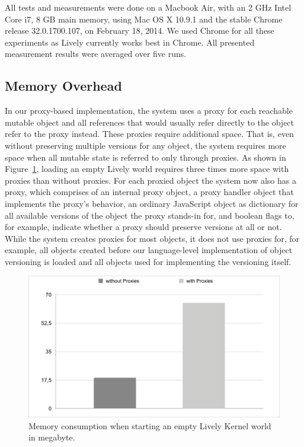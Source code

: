 All tests and measurements were done on a Macbook Air, with an 2 GHz Intel Core i7, 8 GB main memory, using Mac OS X 10.9.1 and the stable Chrome release 32.0.1700.107, on February 18, 2014.
We used Chrome for all these experiments as Lively currently works best in Chrome.
All presented measurement results were averaged over five runs.


\subsection{Memory Overhead}


In our proxy-based implementation, the system uses a proxy for each reachable mutable object and all references that would usually refer directly to the object refer to the proxy instead.
These proxies require additional space.
That is, even without preserving multiple versions for any object, the system requires more space when all mutable state is referred to only through proxies.
As shown in Figure~\ref{fig:MemoryOverhead}, loading an empty Lively world requires three times more space with proxies than without proxies.
For each proxied object the system now also has a proxy, which comprises of an internal proxy object, a proxy handler object that implements the proxy's behavior, an ordinary JavaScript object as dictionary for all available versions of the object the proxy stands-in for, and boolean flags to, for example, indicate whether a proxy should preserve versions at all or not.
While the system creates proxies for most objects, it does not use proxies for, for example, all objects created before our language-level implementation of object versioning is loaded and all objects used for implementing the versioning itself.

\begin{figure}[h]
    \centering
    \includegraphics[width=\textwidth]{figures/memoryOverhead.pdf}
    \caption{Memory consumption when starting an empty Lively Kernel world in megabyte.}
    \label{fig:MemoryOverhead}
\end{figure}

